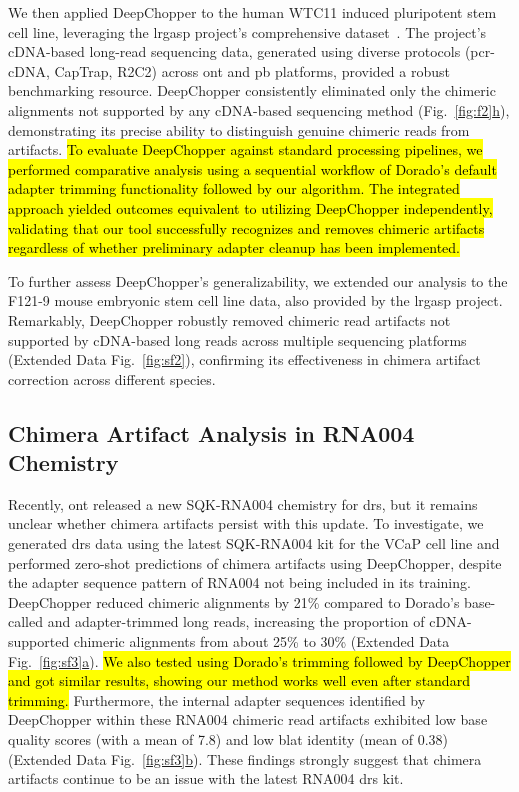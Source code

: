 \documentclass[pdflatex,sn-nature, lineno]{sn-jnl}%
\newcommand{\figref}[2]{Fig.~\hyperref[#1]{\ref*{#1}#2}}
\newcommand{\edfigref}[2]{Extended Data Fig.~\hyperref[#1]{\ref*{#1}#2}}
\begin{document}
We then applied DeepChopper to the human WTC11 induced pluripotent stem cell line, leveraging the \gls{lrgasp} project's comprehensive dataset~\cite{pardo2024systematic}.
The project's cDNA-based long-read sequencing data, generated using diverse protocols (\gls{pcr}-cDNA, CapTrap, R2C2) across \gls{ont} and \gls{pb} platforms, provided a robust benchmarking resource. DeepChopper consistently eliminated only the chimeric alignments not supported by any cDNA-based sequencing method (\figref{fig:f2}{h}), demonstrating its precise ability to distinguish genuine chimeric reads from artifacts.
\hl{To evaluate DeepChopper against standard processing pipelines, we performed comparative analysis using a sequential workflow of Dorado's default adapter trimming functionality followed by our algorithm. The integrated approach yielded outcomes equivalent to utilizing DeepChopper independently, validating that our tool successfully recognizes and removes chimeric artifacts regardless of whether preliminary adapter cleanup has been implemented.}

To further assess DeepChopper's generalizability, we extended our analysis to the F121-9 mouse embryonic stem cell line data, also provided by the \gls{lrgasp} project.
Remarkably, DeepChopper robustly removed chimeric read artifacts not supported by cDNA-based long reads across multiple sequencing platforms (\edfigref{fig:sf2}{}), confirming its effectiveness in chimera artifact correction across different species.

\subsection{Chimera Artifact Analysis in RNA004 Chemistry}

Recently, \gls{ont} released a new SQK-RNA004 chemistry for \gls{drs}, but it remains unclear whether chimera artifacts persist with this update.
To investigate, we generated \gls{drs} data using the latest SQK-RNA004 kit for the VCaP cell line and performed zero-shot predictions of chimera artifacts using DeepChopper, despite the adapter sequence pattern of RNA004 not being included in its training.
DeepChopper reduced chimeric alignments by 21\% compared to Dorado's base-called and adapter-trimmed long reads, increasing the proportion of cDNA-supported chimeric alignments from about 25\% to 30\% (\edfigref{fig:sf3}{a}).
\hl{We also tested using Dorado's trimming followed by DeepChopper and got similar results, showing our method works well even after standard trimming.}
Furthermore, the internal adapter sequences identified by DeepChopper within these RNA004 chimeric read artifacts exhibited low base quality scores (with a mean of 7.8) and low \gls{blat} identity (mean of 0.38) (\edfigref{fig:sf3}{b}).
These findings strongly suggest that chimera artifacts continue to be an issue with the latest RNA004 \gls{drs} kit.
\end{document}
